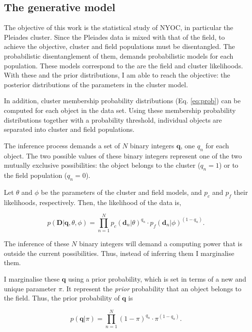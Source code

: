 \subsection{The generative model}
\label{subsect:generative-model}
The objective of this work is the statistical study of NYOC, in particular the Pleiades cluster. Since the Pleiades data is mixed with that of the field, to achieve the objective, cluster and field populations must be disentangled. The probabilistic disentanglement of them, demands probabilistic models for each population. These models correspond to the are the field and cluster likelihoods. With these and the prior distributions, I am able to reach the objective: the posterior distributions of the parameters in the cluster model. 

In addition, cluster membership probability distributions (Eq. \ref{eq:prob}) can be computed for each object in the data set. Using these membership probability distributions together with a probability threshold, individual objects are separated into cluster and field populations.

The inference process demands a set of $N$ binary integers $\mathbf{q}$, one $q_n$ for each object. The two possible values of these binary integers represent one of the two mutually exclusive possibilities: the object belongs to the cluster ($q_n=1$) or to the field population ($q_n=0$). 

Let $\theta$ and $\phi$ be the parameters of the cluster and field models, and $p_c$ and $p_f$ their likelihoods, respectively. Then, the likelihood of the data is,

\begin{equation}
p(\mathbf{D}|\mathbf{q},\theta,\phi)= \prod_{n=1}^N {p_c(\mathbf{d}_n|\theta)}^{q_n}\cdot {p_f(\mathbf{d}_n|\phi)}^{(1-q_n)}.
\end{equation}

The inference of these $N$ binary integers will demand a computing power that is outside the current possibilities. Thus, instead of inferring them I marginalise them. 

I marginalise these $\mathbf{q}$ using a prior probability, which is set in terms of a new and unique parameter $\pi$. It represent the \emph{prior} probability that an object belongs to the field. Thus, the prior probability of $\mathbf{q}$ is

\begin{equation}
p(\mathbf{q}|\pi)= \prod_{n=1}^N {(1-\pi)}^{q_n}\cdot {\pi}^{(1-q_n)}.
\end{equation}

